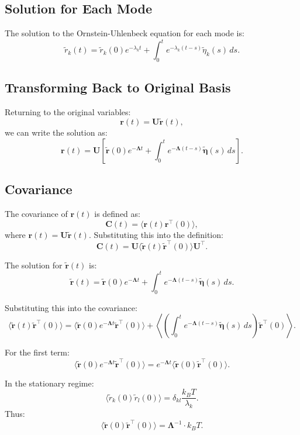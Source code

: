 \documentclass[English, Lau, oneside]{sapthesis}
\begin{document}
\subsection*{Solution for Each Mode}

The solution to the Ornstein-Uhlenbeck equation for each mode is:
\[
\tilde{r}_k(t) = \tilde{r}_k(0) e^{-\lambda_k t} + \int_0^t e^{-\lambda_k (t-s)} \tilde{\eta}_k(s) \, ds.
\]

\subsection*{Transforming Back to Original Basis}

Returning to the original variables:
\[
\mathbf{r}(t) = \mathbf{U} \tilde{\mathbf{r}}(t),
\]
we can write the solution as:
\[
\mathbf{r}(t) = \mathbf{U} \left[ \tilde{\mathbf{r}}(0) e^{-\boldsymbol{\Lambda} t} + \int_0^t e^{-\boldsymbol{\Lambda} (t-s)} \tilde{\boldsymbol{\eta}}(s) \, ds \right].
\]

\subsection {Covariance}
The covariance of \(\mathbf{r}(t)\) is defined as:
\[
\mathbf{C}(t) = \langle \mathbf{r}(t) \mathbf{r}^\top(0) \rangle,
\]
where \(\mathbf{r}(t) = \mathbf{U} \tilde{\mathbf{r}}(t)\). Substituting this into the definition:
\[
\mathbf{C}(t) = \mathbf{U} \langle \tilde{\mathbf{r}}(t) \tilde{\mathbf{r}}^\top(0) \rangle \mathbf{U}^\top.
\]

The solution for \(\tilde{\mathbf{r}}(t)\) is:
\[
\tilde{\mathbf{r}}(t) = \tilde{\mathbf{r}}(0) e^{-\boldsymbol{\Lambda} t} + \int_0^t e^{-\boldsymbol{\Lambda} (t-s)} \tilde{\boldsymbol{\eta}}(s) \, ds.
\]

Substituting this into the covariance:
\[
\langle \tilde{\mathbf{r}}(t) \tilde{\mathbf{r}}^\top(0) \rangle = \langle \tilde{\mathbf{r}}(0) e^{-\boldsymbol{\Lambda} t} \tilde{\mathbf{r}}^\top(0) \rangle + \left\langle \left( \int_0^t e^{-\boldsymbol{\Lambda} (t-s)} \tilde{\boldsymbol{\eta}}(s) \, ds \right) \tilde{\mathbf{r}}^\top(0) \right\rangle.
\]

For the first term:
\[
\langle \tilde{\mathbf{r}}(0) e^{-\boldsymbol{\Lambda} t} \tilde{\mathbf{r}}^\top(0) \rangle = e^{-\boldsymbol{\Lambda} t} \langle \tilde{\mathbf{r}}(0) \tilde{\mathbf{r}}^\top(0) \rangle.
\]

In the stationary regime:
\[
\langle \tilde{r}_k(0) \tilde{r}_l(0) \rangle = \delta_{kl} \frac{k_B T}{\lambda_k}.
\]
Thus:
\[
\langle \tilde{\mathbf{r}}(0) \tilde{\mathbf{r}}^\top(0) \rangle = \boldsymbol{\Lambda}^{-1} \cdot k_B T.
\]
\end{document}
